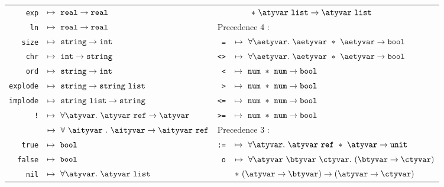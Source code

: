 \begin{figure}
\begin{tabular}{|rl|rl|}
{\tt exp}  & $\mapsto\ \REAL\to\REAL$
                          &             & $\qquad\ast\ \atyvar\ \LIST\to
                                           \atyvar\ \LIST$\\
{\tt ln}   & $\mapsto\ \REAL\to\REAL$
                          & \multicolumn{2}{l|}{Precedence 4 :}\\
{\tt size} & $\mapsto\ \STRING\to\INT$
                          & \verb+=+    & $\mapsto\ \forall\aetyvar.\
                                          \aetyvar\ \ast\ \aetyvar\to\BOOL$\\
{\tt chr}  & $\mapsto\ \INT\to\STRING$
                          & \verb+<>+   & $\mapsto\ \forall\aetyvar.\
                                          \aetyvar\ \ast\ \aetyvar\to\BOOL$\\
{\tt ord}  & $\mapsto\ \STRING\to\INT$
                          & \verb+<+    & $\mapsto\ \NUM\ \ast\ \NUM
                                                                  \to\BOOL$\\
{\tt explode}
           & $\mapsto\ \STRING\to\STRING\ \LIST$
                          & \verb+>+    & $\mapsto\ \NUM\ \ast\ \NUM
                                                                  \to\BOOL$\\
{\tt implode}
           & $\mapsto\ \STRING\ \LIST\to\STRING$
                          & \verb+<=+   & $\mapsto\ \NUM\ \ast\ \NUM
                                                                  \to\BOOL$\\
\verb+!+   & $\mapsto\ \forall\atyvar.\ \atyvar\ \REF\to\atyvar$
                          & \verb+>=+   & $\mapsto\ \NUM\ \ast\ \NUM
                                                                  \to\BOOL$  \\
\REF       & $\mapsto\ \forall\ \aityvar\ .\ \aityvar\to\aityvar\ \REF$
                          & \multicolumn{2}{l|}{Precedence 3 :} \\
{\tt true} & $\mapsto\ \BOOL$
                          & \verb+:=+   & $\mapsto\ \forall\atyvar.\
                                          \atyvar\ \REF\ \ast\ \atyvar\to\UNIT$\\
{\tt false}& $\mapsto\ \BOOL$
                          & {\tt o}     & $\mapsto\ \forall\atyvar\ \btyvar\ 
                                             \ctyvar.\ (\btyvar\to\ctyvar)$\\
{\tt nil}  & $\mapsto\ \forall\atyvar.\ \atyvar\ \LIST$ 
                          &             & \qquad
                                          $\ast\ (\atyvar\to\btyvar)\to(\atyvar\to\ctyvar) $ \\
\hline
\end{tabular}
\vspace{3pt}


\end{figure}
